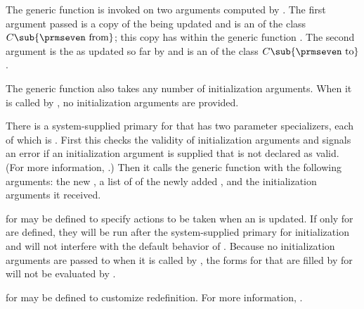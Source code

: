 The generic function  is
invoked on two arguments computed by .  The first
argument passed is a copy of the  being updated and is an
 of the class $C\sub {\hbox{{\prmseven from}}}$; this copy has
 within the generic function .  
The
second argument is the  as updated so far by 
and is an  of the class $C\sub {\hbox{{\prmseven to}}}$.

The generic function  also
takes any number of initialization arguments.  When it is called by
, no initialization arguments are provided.

There is a system-supplied primary  for 
 that has two parameter
specializers, each of which is .  First
this  checks the validity of initialization arguments and
signals an error if an initialization argument is supplied that is not
declared as valid.  (For more information, \seesection\DeclaringInitargValidity.)
Then it calls the
generic function  with the following arguments:
the
new
, a list of  of the newly added 
, and the
initialization arguments it received.

\endsubsection%

             
 for  may be defined
to specify actions to be taken when an  is updated.  If only
 for  are
defined, they will be run after the system-supplied primary  for
initialization and will not interfere with the default behavior of
.  Because no initialization
arguments are passed to  when
it is called by , 
the  forms for 
that are filled by  for 
 will not be evaluated by
.

for  may be defined to customize 
redefinition.  For more information, \seesection\SharedInitialize.
  
\endsubsection%

